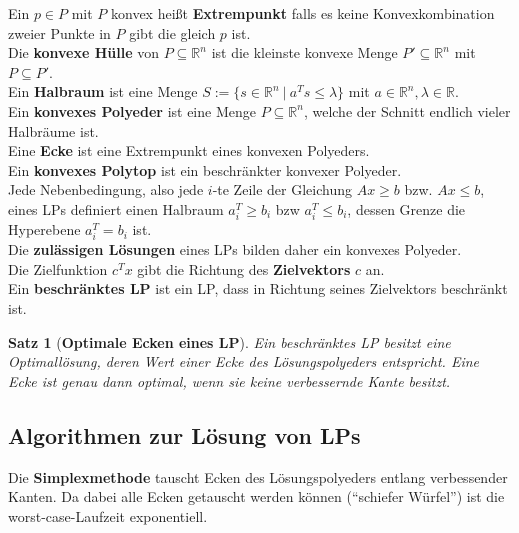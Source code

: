 \documentclass[a4paper,10pt]{scrartcl}
\newcommand{\tbf}{\textbf}
\newcommand{\Ree}{\mathbb{R}}
\newcommand{\Rn}{\mathbb{R}^n}
\newtheorem{satz}{Satz}
\begin{document}
Ein $p \in P$ mit  $P$ konvex heißt \tbf{Extrempunkt} falls es keine Konvexkombination zweier Punkte in $P$ gibt die gleich $p$ ist. \\

Die \tbf{konvexe Hülle} von $P \subseteq \Rn$ ist die kleinste konvexe Menge $P' \subseteq \Rn$ mit $P \subseteq P'$. \\

Ein \tbf{Halbraum} ist eine Menge $S := \{ s \in \Rn \ | \ a^T s \leq \lambda \}$ mit $a \in \Rn, \lambda \in \Ree$. \\

Ein \tbf{konvexes Polyeder} ist eine Menge $P \subseteq \Rn$, welche der Schnitt endlich vieler Halbräume ist. \\

Eine \tbf{Ecke} ist eine Extrempunkt eines konvexen Polyeders. \\

Ein \tbf{konvexes Polytop} ist ein beschränkter konvexer Polyeder. \\

Jede Nebenbedingung, also jede $i$-te Zeile der Gleichung $Ax \geq b$ bzw. $Ax \leq b$, eines LPs definiert einen Halbraum $a_i^T \geq b_i$ bzw $a_i^T \leq b_i$, dessen Grenze die Hyperebene $a_i^T = b_i$ ist. \\

Die \tbf{zulässigen Lösungen} eines LPs bilden daher ein konvexes Polyeder. \\

Die Zielfunktion $c^T x$ gibt die Richtung des \tbf{Zielvektors} $c$ an. \\

Ein \tbf{beschränktes LP} ist ein LP, dass in Richtung seines Zielvektors beschränkt ist. \\

\begin{satz}[\tbf{Optimale Ecken eines LP}]
  Ein beschränktes LP besitzt eine Optimallösung, deren Wert einer Ecke des Lösungspolyeders entspricht. Eine Ecke ist genau dann optimal, wenn sie keine verbessernde Kante besitzt.
\end{satz}

\subsection{Algorithmen zur Lösung von LPs}
Die \tbf{Simplexmethode} tauscht Ecken des Lösungspolyeders entlang verbessender Kanten. Da dabei alle Ecken getauscht werden können (``schiefer Würfel'') ist die worst-case-Laufzeit exponentiell. \\
\end{document}
